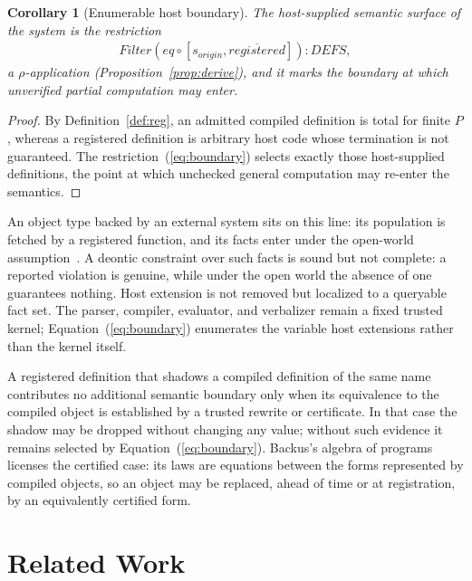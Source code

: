\documentclass[10pt,twocolumn]{article}
\theoremstyle{plain}
\newtheorem{corollary}{Corollary}
\theoremstyle{definition}
\begin{document}
\begin{corollary}[Enumerable host boundary]\label{cor:boundary}
The host-supplied semantic surface of the system is the restriction
\begin{align}
\mathit{Filter}(\mathit{eq}\circ[s_{\mathit{origin}},\overline{\mathit{registered}}])\!:\!\mathit{DEFS}, \label{eq:boundary}
\end{align}
a $\rho$-application (Proposition~\ref{prop:derive}), and it marks the boundary at which unverified partial computation may enter.
\end{corollary}
\begin{proof}
By Definition~\ref{def:reg}, an admitted compiled definition is total for finite $P$, whereas a registered definition is arbitrary host code whose termination is not guaranteed. The restriction~(\ref{eq:boundary}) selects exactly those host-supplied definitions, the point at which unchecked general computation may re-enter the semantics.
\end{proof}

\noindent An object type backed by an external system sits on this line: its population is fetched by a registered function, and its facts enter under the open-world assumption~\cite{halpin08}. A deontic constraint over such facts is sound but not complete: a reported violation is genuine, while under the open world the absence of one guarantees nothing. Host extension is not removed but localized to a queryable fact set. The parser, compiler, evaluator, and verbalizer remain a fixed trusted kernel; Equation~(\ref{eq:boundary}) enumerates the variable host extensions rather than the kernel itself.

\smallskip\noindent A registered definition that shadows a compiled definition of the same name contributes no additional semantic boundary only when its equivalence to the compiled object is established by a trusted rewrite or certificate. In that case the shadow may be dropped without changing any value; without such evidence it remains selected by Equation~(\ref{eq:boundary}). Backus's algebra of programs~\cite[Sec.\,12.2]{backus78} licenses the certified case: its laws are equations between the forms represented by compiled objects, so an object may be replaced, ahead of time or at registration, by an equivalently certified form.



\section{Related Work}\label{sec:related}
\end{document}
